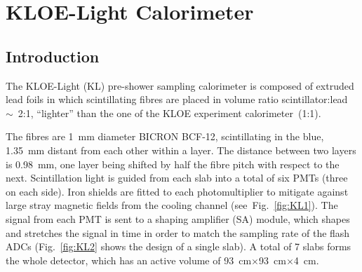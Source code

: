 \graphicspath{{04-KL/Figures/}}

\section{KLOE-Light Calorimeter}
\label{Sect:KL}

\subsection{Introduction}
\label{SubSect:KL_Intro}

The KLOE-Light (KL) pre-shower sampling calorimeter is composed of extruded lead foils in which scintillating
fibres are placed in volume ratio scintillator:lead~$\sim$~2:1, ``lighter'' than the one of the KLOE experiment calorimeter~(1:1).

The fibres are 1~mm diameter BICRON BCF-12, scintillating in the blue, 1.35~mm distant from each other within a layer. The distance between two layers is 0.98~mm, one layer being shifted by half the fibre pitch with respect to the next.
Scintillation light is guided from each slab into a total of six PMTs (three on each side). Iron shields are fitted to each photomultiplier to
mitigate against large stray magnetic fields from the cooling channel (see~Fig.~\ref{fig:KL1}). The signal from each PMT is sent to a shaping amplifier (SA) module, which shapes and stretches the signal in time in order to match the sampling rate of the flash ADCs (Fig.~\ref{fig:KL2} shows the design of a single slab).
A total of 7 slabs forms the whole detector, which has an active volume of 93~cm$\times$93~cm$\times$4~cm.

